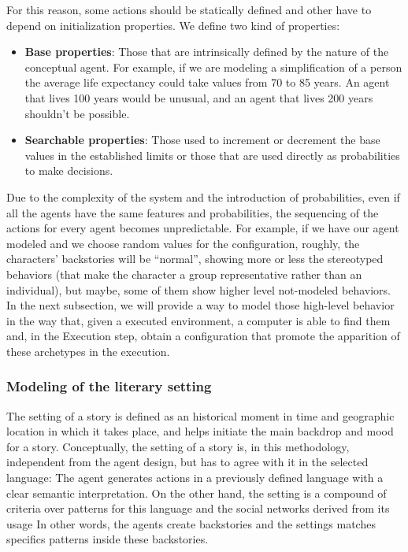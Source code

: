 \documentclass{sig-alternate}
\begin{document}
For this reason, some actions should be statically defined and other have to depend on initialization properties. We define two kind of properties:

\begin{itemize}
\item \textbf{Base properties}: Those that are intrinsically defined by the nature of the conceptual agent. For example, if we are modeling a simplification of a person the average life expectancy could take values from 70 to 85 years. An agent that lives 100 years would be unusual, and an agent that lives 200 years shouldn't be possible.
\item \textbf{Searchable properties}: Those used to increment or decrement the base values in the established limits or those that are used directly as probabilities to make decisions.
\end{itemize}


Due to the complexity of the system and the introduction of probabilities, even if all the agents have the same features and probabilities, the sequencing of the actions for every agent becomes unpredictable. For example, if we have our agent modeled and we choose random values for the configuration, roughly, the characters' backstories will be ``normal'', showing more or less the stereotyped behaviors (that make the character a group representative rather than an individual), but maybe, some of them show higher level not-modeled behaviors. In the next subsection, we will provide a way to model those high-level behavior in the way that, given a executed environment, a computer is able to find them 
and, in the Execution step, obtain a configuration that promote the apparition of these archetypes in the execution.

\subsubsection{Modeling of the literary setting}


The setting of a story is defined as an historical moment in time and geographic location in which it takes place, and helps initiate the main backdrop and mood for a story.
Conceptually, the setting of a story is, in this methodology, independent from the agent design, but has to agree with it in the selected language: 
The agent generates actions in a previously defined language with a clear semantic interpretation. On the other hand, the setting is a compound of criteria over patterns for this language and the social networks derived from its usage In other words, the agents create backstories and the settings matches specifics patterns inside these backstories.
\end{document}
